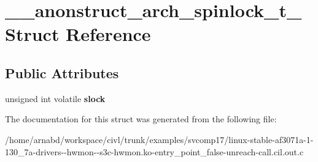 \hypertarget{struct____anonstruct__arch__spinlock__t__12}{}\section{\+\_\+\+\_\+anonstruct\+\_\+arch\+\_\+spinlock\+\_\+t\+\_ Struct Reference}
\label{struct____anonstruct__arch__spinlock__t__12}
\subsection*{Public Attributes}
\begin{DoxyCompactItemize}
\item 
\hypertarget{struct____anonstruct__arch__spinlock__t__12_a0854023e1a0461d0168b33f83c30e0c7}{}unsigned int volatile {\bfseries slock}\label{struct____anonstruct__arch__spinlock__t__12_a0854023e1a0461d0168b33f83c30e0c7}

\end{DoxyCompactItemize}


The documentation for this struct was generated from the following file\+:\begin{DoxyCompactItemize}
\item 
/home/arnabd/workspace/civl/trunk/examples/svcomp17/linux-\/stable-\/af3071a-\/1-\/130\+\_\+7a-\/drivers-\/-\/hwmon-\/-\/s3c-\/hwmon.\+ko-\/entry\+\_\+point\+\_\+false-\/unreach-\/call.\+cil.\+out.\+c\end{DoxyCompactItemize}
